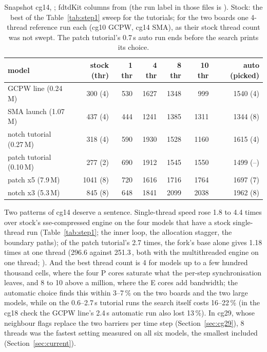 \begin{table}[H]\centering\small
\begin{tabular}{@{}lrrrrrr@{}}
\toprule
model & stock (thr) & 1 thr & 4 thr & 8 thr & 10 thr & auto (picked) \\
\midrule
GCPW line (0.24\,M)      & 300 (4)  & 530 & 1627 & 1348 & 999  & 1540 (4) \\
SMA launch (1.07\,M)     & 437 (4)  & 444 & 1241 & 1385 & 1311 & 1344 (8) \\
notch tutorial (0.27\,M) & 318 (4)  & 590 & 1930 & 1528 & 1160 & 1615 (4) \\
patch tutorial (0.10\,M) & 277 (2)  & 690 & 1912 & 1545 & 1550 & 1499 (--) \\
patch x5 (7.9\,M)        & 1041 (8) & 720 & 1616 & 1716 & 1764 & 1697 (7) \\
notch x3 (5.3\,M)        & 845 (8)  & 648 & 1841 & 2099 & 2038 & 1962 (8) \\
\bottomrule
\end{tabular}
\caption{Snapshot cg14, \MC; fdtdKit columns from  (the run label in those files is
). Stock: the best of the Table~\ref{tab:step1} sweep for the tutorials; for the two boards one 4-thread
reference run each (cg10 GCPW, cg14 SMA), as their stock thread count was not swept. The patch tutorial's 0.7\,s auto
run ends before the search prints its choice.}
\label{tab:final}
\end{table}

Two patterns of cg14 deserve a sentence. Single-thread speed rose 1.8 to 4.4 times over stock's sse-compressed engine
on the four models that have a stock single-thread run (Table~\ref{tab:step1}; the inner loop, the allocation
stagger, the boundary paths); of the patch tutorial's 2.7 times, the fork's base alone gives 1.18 times at one thread (296.6
against 251.3\,\MC, both with the multithreaded engine on one thread; ). And
the best thread count is 4 for models up to a few hundred thousand cells, where the four P cores saturate what the
per-step synchronisation leaves, and 8 to 10 above a million, where the E cores add bandwidth; the automatic choice
finds this within 3--7\,\% on the two boards and the two large models, while on the 0.6--2.7\,s tutorial runs the
search itself costs 16--22\,\% (in the cg18 check the GCPW line's 2.4\,s automatic run also lost 13\,\%). In cg29,
whose neighbour flags replace the two barriers per time step (Section~\ref{sec:cg29}), 8 threads was the fastest
setting measured on all six models, the smallest included (Section~\ref{sec:current}).

